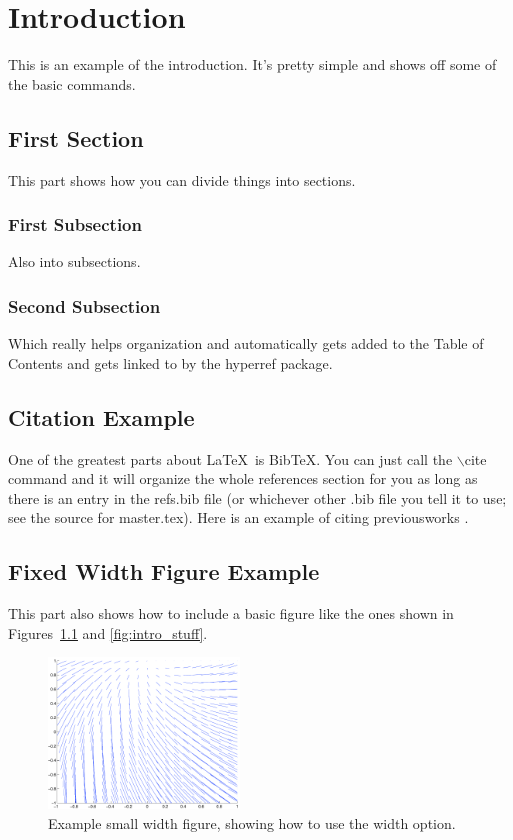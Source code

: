 \chapter{Introduction}
\label{chp:chapter1}
This is an example of the introduction. It's pretty simple and shows off
some of the basic commands.

\section{First Section}
This part shows how you can divide things into sections.

\subsection{First Subsection}
Also into subsections.

\subsection{Second Subsection}
Which really helps organization and automatically gets added to the Table
of Contents and gets linked to by the hyperref package.

\section{Citation Example}
One of the greatest parts about \LaTeX\ is BibTeX. You can just call
the $\backslash$cite command and it will organize the whole references section for you as long as there is an entry in the refs.bib file (or whichever other .bib file you tell it to use; see the source for master.tex).
Here is an example of citing previousworks
\cite{guy06best,guy06second}.

\section{Fixed Width Figure Example} \label{sec:intro_figure_example}
This part also shows how to include a basic figure like the ones
shown in Figures~\ref{fig:intro_stuff2} and \ref{fig:intro_stuff}. %
\begin{figure}[t]
  \centering
  \includegraphics[width = 2in]{images/stuff}
  \caption[Example small width figure]{
Example small width figure, showing how to use the width option.}
%
  \label{fig:intro_stuff2}
\end{figure}

